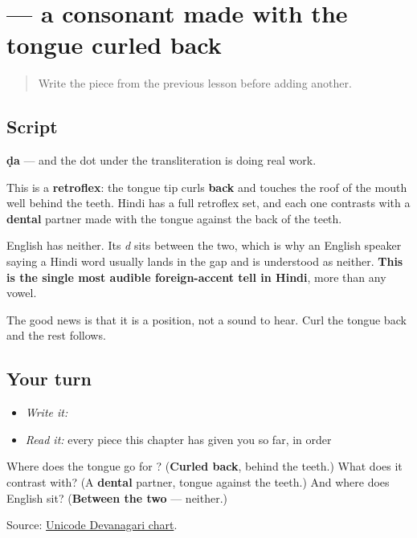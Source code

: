 \section[\texorpdfstring{\hi{ड} (ḍa)}{ड (ḍa)}]{ — a consonant made with the tongue curled back}

\label{lesson:HI-W12-da-retroflex}



\begin{quote}
Write the piece from the previous lesson before adding another.
\end{quote}

\subsection*{Script}

\begin{quote}
\end{quote}

\textbf{ḍa} — and the dot under the transliteration is doing real work.

This is a \textbf{retroflex}: the tongue tip curls \textbf{back} and touches the roof of the mouth well behind the teeth. Hindi has a full retroflex set, and each one contrasts with a \textbf{dental} partner made with the tongue against the back of the teeth.

English has neither. Its \emph{d} sits between the two, which is why an English speaker saying a Hindi word usually lands in the gap and is understood as neither. \textbf{This is the single most audible foreign-accent tell in Hindi}, more than any vowel.

The good news is that it is a position, not a sound to hear. Curl the tongue back and the rest follows.

\subsection*{Your turn}
\begin{itemize}
\raggedright
  \item \emph{Write it:} 
  \item \emph{Read it:} every piece this chapter has given you so far, in order
\end{itemize}

\begin{tcolorbox}[breakable,colback=teal!4,colframe=teal!35!black,title={Before you move on}]
Where does the tongue go for \textbf{}? (\textbf{Curled back}, behind the teeth.) What does it contrast with? (A \textbf{dental} partner, tongue against the teeth.) And where does English sit? (\textbf{Between the two} — neither.)

Source: \href{https://www.unicode.org/charts/PDF/U0900.pdf}{Unicode Devanagari chart}.
\end{tcolorbox}

